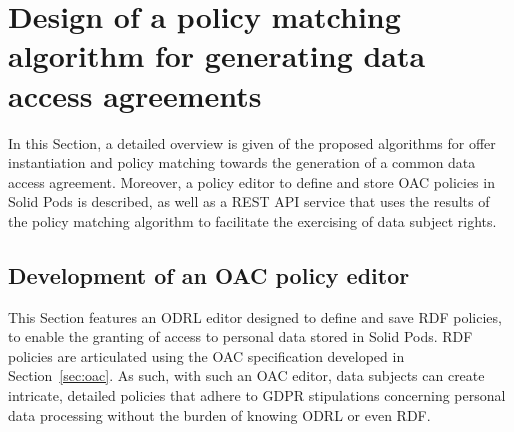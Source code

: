 \section{Design of a policy matching algorithm for generating data access agreements}
\label{sec:algorithm}

In this Section, a detailed overview is given of the proposed algorithms for offer instantiation and policy matching towards the generation of a common data access agreement.
Moreover, a policy editor to define and store OAC policies in Solid Pods is described, as well as a REST API service that uses the results of the policy matching algorithm to facilitate the exercising of data subject rights.


\subsection{Development of an OAC policy editor}
\label{sec:sope}

This Section features an ODRL editor designed to define and save RDF policies, to enable the granting of access to personal data stored in Solid Pods.
RDF policies are articulated using the OAC specification developed in Section~\ref{sec:oac}.
As such, with such an OAC editor, data subjects can create intricate, detailed policies that adhere to GDPR stipulations concerning personal data processing without the burden of knowing ODRL or even RDF.

